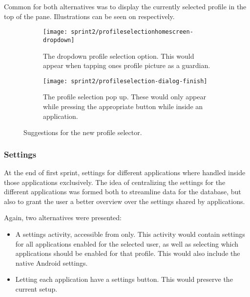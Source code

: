
Common for both alternatives was to display the currently selected profile in the top of the pane.
Illustrations can be seen on  respectively.

\begin{figure}[h] %
\centering
    \begin{subfigure}[t]{.48\textwidth}
    \centering
    \texttt{[image: sprint2/profileselectionhomescreen-dropdown]}
    \caption{The dropdown profile selection option. This would appear when tapping ones profile picture as a guardian.}
    \label{fig:profileselectionlauncherdropdown}
    \end{subfigure}
    \hfill
    \begin{subfigure}[t]{.48\textwidth}
    \centering
    \texttt{[image: sprint2/profileselection-dialog-finish]}
    \caption{The profile selection pop up. These would only appear while pressing the appropriate button while inside an application.}
    \label{fig:profileselectionapppopup}
    \end{subfigure}
\caption{Suggestions for the new profile selector.}
\label{fig:drawerstates}
\end{figure}

\subsubsection{Settings}

At the end of first sprint, settings for different applications where handled inside those applications exclusively.
The idea of centralizing the settings for the different applications was formed both to streamline data for the database, but also to grant the user a better overview over the settings shared by applications.

Again, two alternatives were presented:

\begin{itemize}
\item A settings activity, accessible from \launcher only.
This activity would contain settings for all applications enabled for the selected user, as well as selecting which applications should be enabled for that profile.
This would also include the native Android settings.
\item Letting each application have a settings button.
This would preserve the current setup.
\end{itemize}

